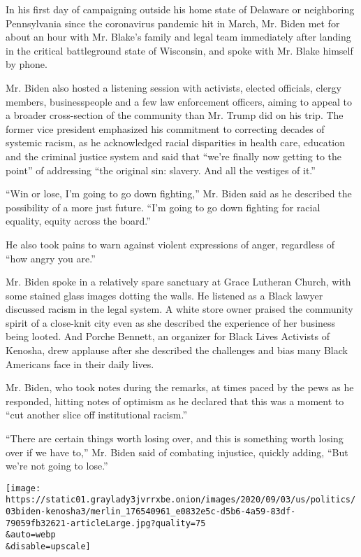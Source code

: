 In his first day of campaigning outside his home state of Delaware or
neighboring Pennsylvania since the coronavirus pandemic hit in March,
Mr. Biden met for about an hour with Mr. Blake's family and legal team
immediately after landing in the critical battleground state of
Wisconsin, and spoke with Mr. Blake himself by phone.

Mr. Biden also hosted a listening session with activists, elected
officials, clergy members, businesspeople and a few law enforcement
officers, aiming to appeal to a broader cross-section of the community
than Mr. Trump did on his trip. The former vice president emphasized his
commitment to correcting decades of systemic racism, as he acknowledged
racial disparities in health care, education and the criminal justice
system and said that ``we're finally now getting to the point'' of
addressing ``the original sin: slavery. And all the vestiges of it.''

``Win or lose, I'm going to go down fighting,'' Mr. Biden said as he
described the possibility of a more just future. ``I'm going to go down
fighting for racial equality, equity across the board.''

He also took pains to warn against violent expressions of anger,
regardless of ``how angry you are.''

Mr. Biden spoke in a relatively spare sanctuary at Grace Lutheran
Church, with some stained glass images dotting the walls. He listened as
a Black lawyer discussed racism in the legal system. A white store owner
praised the community spirit of a close-knit city even as she described
the experience of her business being looted. And Porche Bennett, an
organizer for Black Lives Activists of Kenosha, drew applause after she
described the challenges and bias many Black Americans face in their
daily lives.

Mr. Biden, who took notes during the remarks, at times paced by the pews
as he responded, hitting notes of optimism as he declared that this was
a moment to ``cut another slice off institutional racism.''

``There are certain things worth losing over, and this is something
worth losing over if we have to,'' Mr. Biden said of combating
injustice, quickly adding, ``But we're not going to lose.''

\texttt{[image: https://static01.graylady3jvrrxbe.onion/images/2020/09/03/us/politics/03biden-kenosha3/merlin\_176540961\_e0832e5c-d5b6-4a59-83df-79059fb32621-articleLarge.jpg?quality=75\\\&auto=webp\\\&disable=upscale]}


